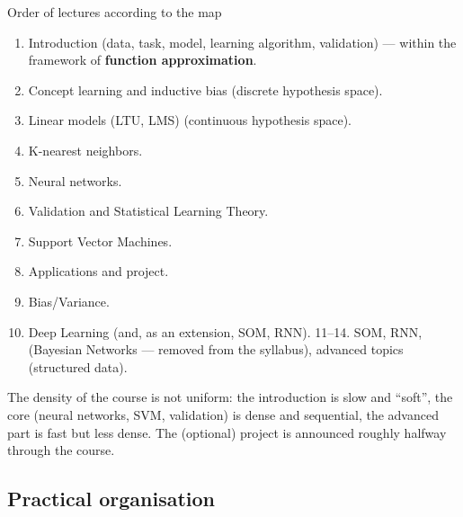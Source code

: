 \begin{boxnote}{Order of lectures according to the map}

\begin{enumerate}
\def\labelenumi{\arabic{enumi}.}
\tightlist
\item
  Introduction (data, task, model, learning algorithm, validation) ---
  within the framework of \textbf{function approximation}.
\item
  Concept learning and inductive bias (discrete hypothesis space).
\item
  Linear models (LTU, LMS) (continuous hypothesis space).
\item
  K-nearest neighbors.
\item
  Neural networks.
\item
  Validation and Statistical Learning Theory.
\item
  Support Vector Machines.
\item
  Applications and project.
\item
  Bias/Variance.
\item
  Deep Learning (and, as an extension, SOM, RNN). 11--14. SOM, RNN,
  (Bayesian Networks --- removed from the syllabus), advanced topics
  (structured data).
\end{enumerate}

\end{boxnote}

The density of the course is not uniform: the introduction is slow and
``soft'', the core (neural networks, SVM, validation) is dense and
sequential, the advanced part is fast but less dense. The (optional)
project is announced roughly halfway through the course.

\subsection{Practical organisation}\label{organizzazione-pratica}

